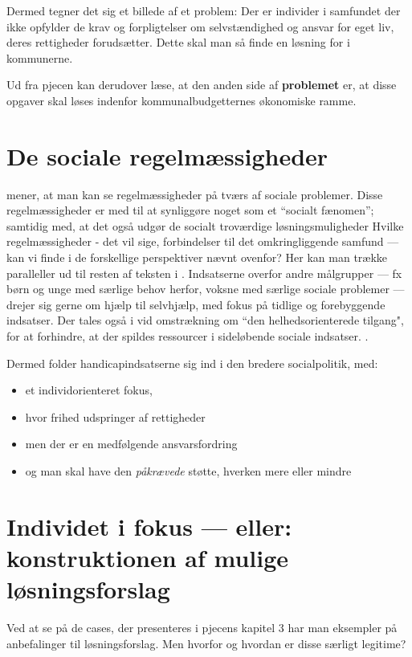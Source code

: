 Dermed tegner det sig et billede af et problem: Der er individer i samfundet der ikke opfylder de krav og forpligtelser om selvstændighed og ansvar for eget liv, deres rettigheder forudsætter. Dette skal man så finde en løsning for i kommunerne.

Ud fra pjecen kan derudover læse, at den anden side af \textbf{problemet} er, at disse opgaver skal løses indenfor kommunalbudgetternes økonomiske ramme.

\section{De sociale regelmæssigheder}

\citeauthor{scheurichPolicyArchaeologyNew1994} mener, at man kan se regelmæssigheder på tværs af sociale problemer.
Disse regelmæssigheder er med til at synliggøre noget som et “socialt fænomen”; samtidig med, at det også udgør de socialt troværdige løsningsmuligheder \autocite[s. 301]{scheurichPolicyArchaeologyNew1994}
Hvilke regelmæssigheder - det vil sige, forbindelser til det omkringliggende samfund — kan vi finde i de forskellige perspektiver nævnt ovenfor?
Her kan man trække paralleller ud til resten af teksten i  .
Indsatserne overfor andre målgrupper — fx børn og unge med særlige behov herfor, voksne med særlige sociale problemer — drejer sig gerne om hjælp til selvhjælp, med fokus på tidlige og forebyggende indsatser. Der tales også i vid omstrækning om “den helhedsorienterede tilgang", for at forhindre, at der spildes ressourcer i sideløbende sociale indsatser. \autocite[Kap. 6, 15]{social-ogindenrigsministerietBekendtgorelseAfLov2019}.

Dermed folder handicapindsatserne sig ind i den bredere socialpolitik, med:
\begin{itemize}
  \item
    et individorienteret fokus, 
  \item
    hvor frihed udspringer af rettigheder
  \item
    men der er en medfølgende ansvarsfordring
  \item
    og man skal have den \textit{påkrævede} støtte, hverken mere eller mindre
\end{itemize}
\section{Individet i fokus — eller: konstruktionen af mulige løsningsforslag}
Ved at se på de cases, der presenteres i pjecens kapitel 3 har man eksempler på anbefalinger til løsningsforslag.
Men hvorfor og hvordan er disse særligt legitime? 


